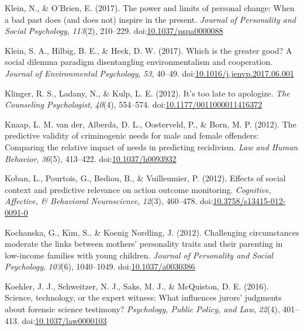 \documentclass[english,man]{apa6}
\begin{document}
\hypertarget{ref-Klein2017a}{}
Klein, N., \& O'Brien, E. (2017). The power and limits of personal
change: When a bad past does (and does not) inspire in the present.
\emph{Journal of Personality and Social Psychology}, \emph{113}(2),
210--229.
doi:\href{https://doi.org/10.1037/pspa0000088}{10.1037/pspa0000088}

\hypertarget{ref-Klein2017}{}
Klein, S. A., Hilbig, B. E., \& Heck, D. W. (2017). Which is the greater
good? A social dilemma paradigm disentangling environmentalism and
cooperation. \emph{Journal of Environmental Psychology}, \emph{53},
40--49.
doi:\href{https://doi.org/10.1016/j.jenvp.2017.06.001}{10.1016/j.jenvp.2017.06.001}

\hypertarget{ref-Klinger2012}{}
Klinger, R. S., Ladany, N., \& Kulp, L. E. (2012). It's too late to
apologize. \emph{The Counseling Psychologist}, \emph{40}(4), 554--574.
doi:\href{https://doi.org/10.1177/0011000011416372}{10.1177/0011000011416372}

\hypertarget{ref-VanderKnaap2012}{}
Knaap, L. M. van der, Alberda, D. L., Oosterveld, P., \& Born, M. P.
(2012). The predictive validity of criminogenic needs for male and
female offenders: Comparing the relative impact of needs in predicting
recidivism. \emph{Law and Human Behavior}, \emph{36}(5), 413--422.
doi:\href{https://doi.org/10.1037/h0093932}{10.1037/h0093932}

\hypertarget{ref-Koban2012}{}
Koban, L., Pourtois, G., Bediou, B., \& Vuilleumier, P. (2012). Effects
of social context and predictive relevance on action outcome monitoring.
\emph{Cognitive, Affective, \& Behavioral Neuroscience}, \emph{12}(3),
460--478.
doi:\href{https://doi.org/10.3758/s13415-012-0091-0}{10.3758/s13415-012-0091-0}

\hypertarget{ref-Kochanska2012}{}
Kochanska, G., Kim, S., \& Koenig Nordling, J. (2012). Challenging
circumstances moderate the links between mothers' personality traits and
their parenting in low-income families with young children.
\emph{Journal of Personality and Social Psychology}, \emph{103}(6),
1040--1049.
doi:\href{https://doi.org/10.1037/a0030386}{10.1037/a0030386}

\hypertarget{ref-Koehler2016}{}
Koehler, J. J., Schweitzer, N. J., Saks, M. J., \& McQuiston, D. E.
(2016). Science, technology, or the expert witness: What influences
jurors' judgments about forensic science testimony? \emph{Psychology,
Public Policy, and Law}, \emph{22}(4), 401--413.
doi:\href{https://doi.org/10.1037/law0000103}{10.1037/law0000103}
\end{document}
